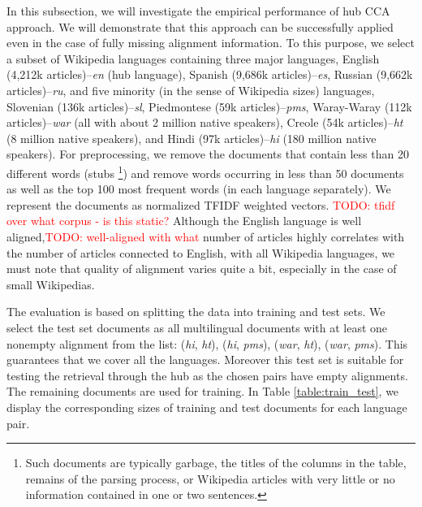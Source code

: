 \documentclass[twoside,11pt]{article}
\newcommand{\todo}[1]{\textcolor{red}{TODO: #1}}
\begin{document}
 In this subsection, we will investigate the empirical performance of hub CCA approach. We will demonstrate that this approach can be successfully applied even in the case of fully missing alignment information.
 To this purpose, we select a subset of Wikipedia languages containing three major languages, English (4,212k articles)--\emph{en} (hub language), Spanish (9,686k articles)--\emph{es}, Russian (9,662k articles)--\emph{ru}, and five minority (in the sense of Wikipedia sizes) languages, Slovenian (136k articles)--\emph{sl}, Piedmontese (59k articles)--\emph{pms}, Waray-Waray (112k articles)--\emph{war} (all with about 2 million native speakers), Creole (54k articles)--\emph{ht} (8 million native speakers), and Hindi (97k articles)--\emph{hi} (180 million native speakers). For preprocessing, we remove the documents that contain less than 20 different words (stubs \footnote{Such documents are typically garbage, the titles of the columns in the table, remains of the parsing process, or Wikipedia articles with very little or no information contained in one or two sentences.}) and remove words occurring in less than 50 documents as well as the top 100 most frequent words (in each language separately). We represent the documents as normalized TFIDF\cite{Salton88term-weightingapproaches} weighted vectors.
 \todo{tfidf over what corpus  - is this static?}
 Although the English language is well aligned,\todo{well-aligned with what} number of articles highly correlates with the
    number of articles connected to English, with all Wikipedia languages, we must note that quality of alignment varies quite a bit, especially in the case of small Wikipedias.


The evaluation is based on splitting the data into training and test sets. %
We select the test set documents as all multilingual documents with at least one nonempty alignment from the list: (\emph{hi}, \emph{ht}), (\emph{hi}, \emph{pms}), (\emph{war}, \emph{ht}), (\emph{war}, \emph{pms}). This guarantees that we cover all the languages. Moreover this test set is suitable for testing the retrieval through the hub as the chosen pairs have empty alignments. The remaining documents are used for training. In Table \ref{table:train_test}, we display the corresponding sizes of training and test documents for each language pair.
\end{document}
